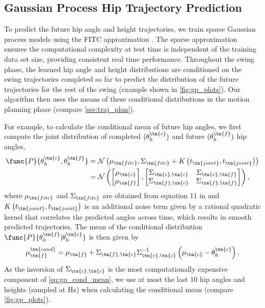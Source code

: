 \subsection{Gaussian Process Hip Trajectory Prediction}

\label{sec:predict_gp}
To predict the future hip angle and height trajectories, we train sparse
Gaussian process models using the FITC approximation \citep{snelson2007local}.
The sparse approximation ensures the computational complexity at test time is
independent of the training data set size, providing consistent real time
performance. Throughout the swing phase, the learned hip angle and height
distributions are conditioned on the swing trajectories completed so far to
predict the distribution of the future trajectories for the rest of the swing
(example shown in \cref{fig:gp_plots}). Our algorithm then uses the means of
these conditional distributions in the motion planning phase
(compare \cref{sec:traj_plan}). 

For example, to calculate the conditional mean of future hip angles, we first
compute the joint distribution of completed $(\theta_h^\tn{c})$ and future
$(\theta_h^\tn{f})$ hip angles,
\begin{align}
    \func{P}{\theta_h^\tn{c}, \theta_h^\tn{f}} &=
        \mathcal{N}\left(\mu_\tn{fitc}, \Sigma_\tn{fitc} 
            + K\left( t_\tn{joint}, t_\tn{joint} \right) \right) \\
    &= \mathcal{N}\left( 
        \begin{bmatrix} 
            \mu_\tn{c} \\ \mu_\tn{f} 
        \end{bmatrix},
        \begin{bmatrix} 
            \Sigma_{\tn{c},\tn{c}} & \Sigma_{\tn{c},\tn{f}} \\ 
            \Sigma_{\tn{f},\tn{c}} & \Sigma_{\tn{f},\tn{f}} 
        \end{bmatrix}
        \right),
\end{align}
where $\mu_\tn{fitc}$ and $\Sigma_\tn{fitc}$ are obtained from equation 11 in
\citep{snelson2007local} and $K\left( t_\tn{joint}, t_\tn{joint}\right)$ is an
additional noise term given by a rational quadratic kernel
\citep{rasmussen2004gaussian} that correlates the predicted angles across time,
which results in smooth predicted trajectories. The mean of the conditional
distribution $\func{P}{\theta_h^\tn{f}|\theta_h^\tn{c}}$ is then given by
\begin{align}
    \mu_\tn{f}^\tn{cond} = \mu_\tn{f} + \Sigma_{\tn{f},\tn{c}}
        \Sigma_{\tn{c},\tn{c}}^{-1}\left(\mu_\tn{c} - \theta_h^\tn{c} \right).
    \label{eq:gp_cond_mean}
\end{align}
As the inversion of $\Sigma_{\tn{c},\tn{c}}$ is the most computationally
expensive component of \cref{eq:gp_cond_mean}, we use at most the last 10 hip
angles and heights (sampled at \unit[100]{Hz}) when calculating the conditional
mean (compare \cref{fig:gp_plots}).

